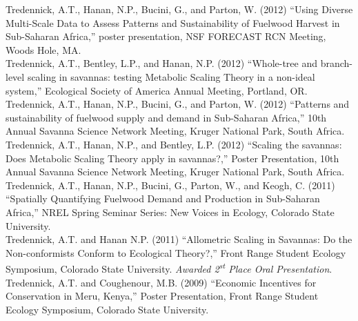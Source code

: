 \documentclass[margin,line]{resume}
\begin{document}
\begin{resume}
    Tredennick, A.T., Hanan, N.P., Bucini, G., and Parton, W. (2012) ``Using Diverse Multi-Scale Data to Assess Patterns and Sustainability of Fuelwood Harvest in Sub-Saharan Africa,'' poster presentation, NSF FORECAST RCN Meeting, Woods Hole, MA. \vspace{-6mm}\\%
    
    Tredennick, A.T., Bentley, L.P., and Hanan, N.P. (2012) ``Whole-tree and branch-level scaling in savannas: testing Metabolic Scaling Theory in a non-ideal system,'' Ecological Society of America Annual Meeting, Portland, OR. \vspace{-6mm}\\%
    
    Tredennick, A.T., Hanan, N.P., Bucini, G., and Parton, W. (2012) ``Patterns and sustainability of fuelwood supply and demand in Sub-Saharan Africa,'' 10th Annual Savanna Science Network Meeting, Kruger National Park, South Africa.\vspace{-6mm}\\%
    
    Tredennick, A.T., Hanan, N.P., and Bentley, L.P. (2012) ``Scaling the savannas: Does Metabolic Scaling Theory apply in savannas?,'' Poster Presentation, 10th Annual Savanna Science Network Meeting, Kruger National Park, South Africa. \vspace{-6mm}\\%
    
    Tredennick, A.T., Hanan, N.P., Bucini, G., Parton, W., and Keogh, C. (2011) ``Spatially Quantifying Fuelwood Demand and Production in Sub-Saharan Africa,'' NREL Spring Seminar Series: New Voices in Ecology, Colorado State University.\vspace{-6mm}\\%
    
    Tredennick, A.T. and Hanan N.P. (2011) ``Allometric Scaling in Savannas: Do the Non-conformists Conform to Ecological Theory?,'' Front Range Student Ecology Symposium, Colorado State University. \textsl{Awarded 2\textsuperscript{st} Place Oral Presentation}.\vspace{-6mm}\\%
  
  Tredennick, A.T. and Coughenour, M.B. (2009) ``Economic Incentives for Conservation in Meru, Kenya,'' Poster Presentation, Front Range Student Ecology Symposium, Colorado State University.

\end{resume}
\end{document}

